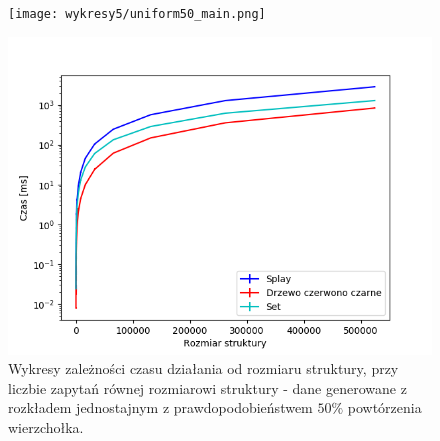 \documentclass[declaration,shortabstract]{iithesis}
\theoremstyle{thm}
\theoremstyle{remark}
\theoremstyle{plain}
\theoremstyle{plain}
\theoremstyle{plain}
\begin{document}
\begin{figure}[H]
\begin{minipage}[b]{.45\textwidth}
\centering
\texttt{[image: wykresy5/uniform50\_main.png]}
\end{minipage}
\hfill
\begin{minipage}[b]{.45\textwidth}
\centering
\includegraphics[width=1\textwidth]{wykresy3/uniform50_main.png}
\end{minipage}
\caption{Wykresy zależności czasu działania od rozmiaru struktury, przy liczbie zapytań równej rozmiarowi struktury - dane generowane z rozkładem jednostajnym z prawdopodobieństwem  \(50\%\) powtórzenia wierzchołka.}
\end{figure}
\end{document}
